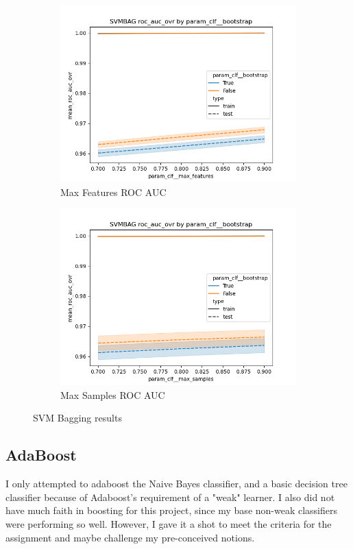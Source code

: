 \documentclass[12pt]{article}
\begin{document}
\begin{figure}
\begin{subfigure}{.5\textwidth}
      \includegraphics[width=.95\textwidth]{../../results/SVMbag/param_clf__bootstrap_roc_auc_ovr_param_clf__max_features.png}
      \caption{Max Features ROC AUC}
      \end{subfigure}%
    \begin{subfigure}{.5\textwidth}
      \includegraphics[width=.95\textwidth]{../../results/SVMbag/param_clf__bootstrap_roc_auc_ovr_param_clf__max_samples.png}
      \caption{Max Samples ROC AUC}
    \end{subfigure}
    \caption{SVM Bagging results}
    \label{figure3}
\end{figure}

\subsection{AdaBoost}
I only attempted to adaboost the Naive Bayes classifier, and a basic decision tree classifier because of Adaboost's requirement of a "weak" 
learner. I also did not have much faith in boosting for this project, since my base non-weak classifiers were performing so well. However, I 
gave it a shot to meet the criteria for the assignment and maybe challenge my pre-conceived notions.
\end{document}
